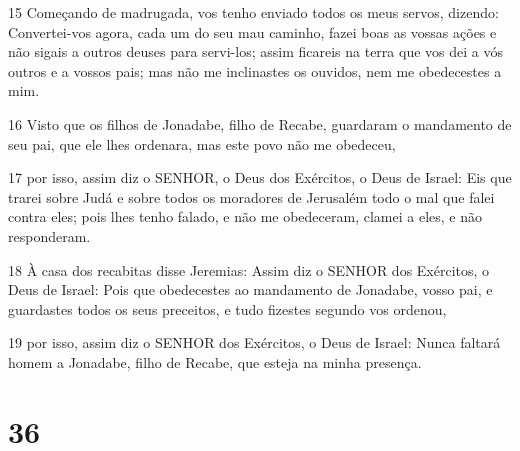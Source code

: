 \par 15 Começando de madrugada, vos tenho enviado todos os meus servos, dizendo: Convertei-vos agora, cada um do seu mau caminho, fazei boas as vossas ações e não sigais a outros deuses para servi-los; assim ficareis na terra que vos dei a vós outros e a vossos pais; mas não me inclinastes os ouvidos, nem me obedecestes a mim.
\par 16 Visto que os filhos de Jonadabe, filho de Recabe, guardaram o mandamento de seu pai, que ele lhes ordenara, mas este povo não me obedeceu,
\par 17 por isso, assim diz o SENHOR, o Deus dos Exércitos, o Deus de Israel: Eis que trarei sobre Judá e sobre todos os moradores de Jerusalém todo o mal que falei contra eles; pois lhes tenho falado, e não me obedeceram, clamei a eles, e não responderam.
\par 18 À casa dos recabitas disse Jeremias: Assim diz o SENHOR dos Exércitos, o Deus de Israel: Pois que obedecestes ao mandamento de Jonadabe, vosso pai, e guardastes todos os seus preceitos, e tudo fizestes segundo vos ordenou,
\par 19 por isso, assim diz o SENHOR dos Exércitos, o Deus de Israel: Nunca faltará homem a Jonadabe, filho de Recabe, que esteja na minha presença.

\chapter{36}


